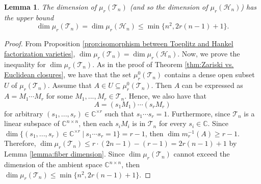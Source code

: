 \documentclass[reqno]{amsart}
\newtheorem{lemma}[theorem]{Lemma}
\theoremstyle{definition}
\numberwithin{equation}{section}
\begin{document}
\begin{lemma}\label{lemma:upper bound of the dimension, toeplitz}
    The dimension of $\mu_r(\mathcal{T}_n)$ (and so the dimension of $\mu_r(\mathcal{H}_n)$) has the upper bound
    \begin{equation*}
        \dim \mu_r(\mathcal{T}_n) = \dim \mu_r(\mathcal{H}_n) \leq \min\{n^2, 2r(n-1)+1\}.
    \end{equation*}
\end{lemma}
\begin{proof}
    From Proposition \ref{prop:isomorphism between Toeplitz and Hankel factorization varieties}, $\dim \mu_r(\mathcal{T}_n)=\dim \mu_r(\mathcal{H}_n)$. Now, we prove the inequality for $\dim \mu_r(\mathcal{T}_n)$. As in the proof of Theorem \ref{thm:Zariski vs. Euclidean closures}, we have that the set $\mu_r^0(\mathcal{T}_n)$ contains a dense open subset $U$ of $\mu_r(\mathcal{T}_n)$. Assume that $A \in U \subseteq \mu_r^0(\mathcal{T}_n)$. Then $A$ can be expressed as $A=M_1\cdots M_r$ for some $M_1,...,M_r \in \mathcal{T}_n$. Hence, we also have that
    \begin{equation*}
        A=(s_1M_1)\cdots (s_rM_r)
    \end{equation*}
    for arbitrary $(s_1,...,s_r) \in \mathbb{C}^{\times r}$ such that $s_1\cdots s_r=1$. Furthermore, since $\mathcal{T}_n$ is a linear subspace of $\mathbb{C}^{n \times n}$, then each $s_iM_i$ is in $\mathcal{T}_n$ for every $s_i \in \mathbb{C}$. Since $\dim \{(s_1,...,s_r)\in \mathbb{C}^{\times r}~|~s_1\cdots s_r=1\}=r-1$, then $\dim m_r^{-1}(A) \geq r-1$. Therefore, $\dim \mu_r(\mathcal{T}_n) \leq r \cdot (2n-1)-(r-1)=2r(n-1)+1$ by Lemma \ref{lemma:fiber dimension}. Since $\dim \mu_r(\mathcal{T}_n)$ cannot exceed the dimension of the ambient space $ \mathbb{C}^{n \times n}$, then $\dim \mu_r(\mathcal{T}_n) \leq \min\{n^2, 2r(n-1)+1\}$.
\end{proof}
\end{document}
